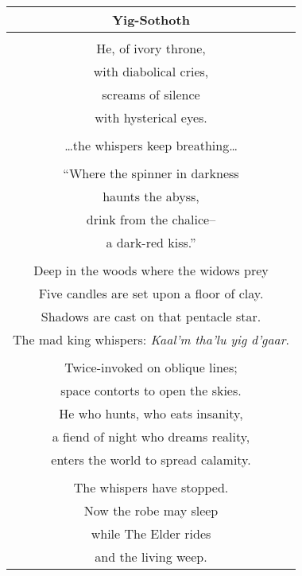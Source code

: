 \documentclass{article}
\begin{document}
\begin{center}
\begin{tabular}{c}
\textbf{Yig-Sothoth} \\ \hline
\\
He, of ivory throne, \\
with diabolical cries, \\
screams of silence \\
with hysterical eyes. \\
\\
\ldots{}the whispers keep breathing\ldots{} \\
\\
``Where the spinner in darkness \\
haunts the abyss, \\
drink from the chalice-- \\
a dark-red kiss.'' \\
\\
Deep in the woods where the widows prey \\
Five candles are set upon a floor of clay. \\
Shadows are cast on that pentacle star. \\
The mad king whispers: \textit{Kaal'm tha'lu yig d'gaar}. \\
\\
Twice-invoked on oblique lines; \\
space contorts to open the skies. \\
He who hunts, who eats insanity, \\
a fiend of night who dreams reality, \\
enters the world to spread calamity. \\
\\
The whispers have stopped. \\
Now the robe may sleep \\
while The Elder rides \\
and the living weep. \\
\end{tabular}
\end{center}
\end{document}
